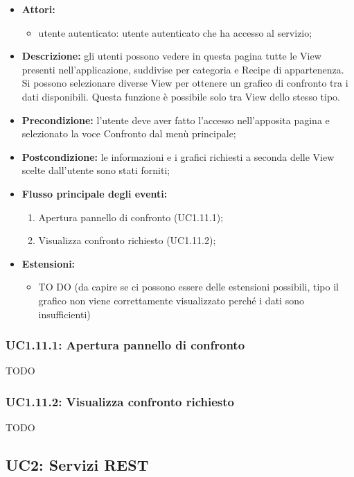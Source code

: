 \begin{itemize}
	\item \textbf{Attori:}
	\begin{itemize}
		\item utente autenticato: utente autenticato che ha accesso al servizio;
	\end{itemize}
	\item \textbf{Descrizione:} gli utenti possono vedere in questa pagina tutte le View presenti nell'applicazione, suddivise per categoria e Recipe di appartenenza. Si possono selezionare diverse View per ottenere un grafico di confronto tra i dati disponibili. Questa funzione è possibile solo tra View dello stesso tipo.
	\item \textbf{Precondizione:} l'utente deve aver fatto l'accesso nell'apposita pagina e selezionato la voce Confronto dal menù principale;
	\item \textbf{Postcondizione:} le informazioni e i grafici richiesti a seconda delle View scelte dall'utente sono stati forniti;
	\item \textbf{Flusso principale degli eventi:}
	\begin{enumerate}
		\item Apertura pannello di confronto (UC1.11.1);
		\item Visualizza confronto richiesto (UC1.11.2);
	\end{enumerate}
	\item \textbf{Estensioni:}
	\begin{itemize}
		\item TO DO (da capire se ci possono essere delle estensioni possibili, tipo il grafico non viene correttamente visualizzato perché i dati sono insufficienti)
	\end{itemize}
\end{itemize}

\subsubsection{UC1.11.1:  Apertura pannello di confronto} TODO
\subsubsection{UC1.11.2:  Visualizza confronto richiesto} TODO



\pagebreak

\subsection{UC2: Servizi REST}

